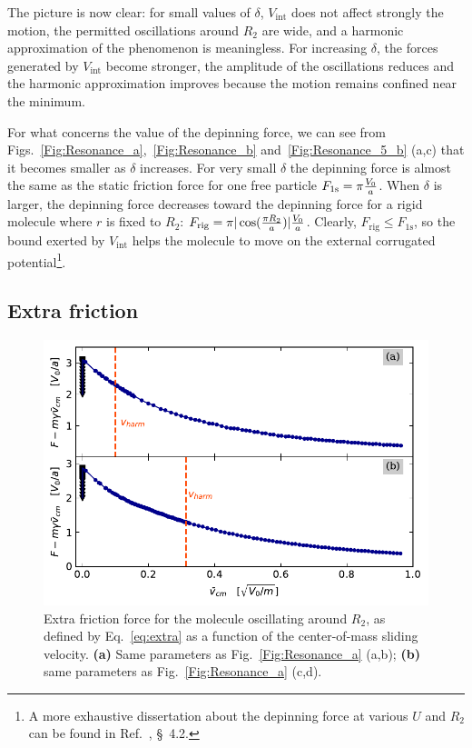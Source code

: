  

The picture is now clear: for small values of $\delta$, $V_\text{int}$ does not affect strongly the motion, the permitted oscillations around $R_2$ are wide, and a harmonic approximation of the phenomenon is meaningless. For increasing $\delta$, the forces generated by $V_\text{int}$ become stronger, the amplitude of the oscillations reduces and the harmonic approximation improves because the motion remains confined near the minimum.

For what concerns the value of the depinning force, we can see from Figs.~\ref{Fig:Resonance_a},~\ref{Fig:Resonance_b} and~\ref{Fig:Resonance_5_b}  (a,c) that it becomes smaller as $\delta$ increases. For very small $\delta$ the depinning force is almost the same as the static friction force for one free particle $F_\text{1s} = \pi \frac{V_0}{a}$. When $\delta$ is larger, the depinning force decreases toward the depinning force for a rigid molecule where $r$ is fixed to $R_2$: $F_\text{rig} = \pi |\cos(\frac{\pi R_2}{a})| \frac{V_0}{a}$. Clearly, $F_\text{rig} \leq F_\text{1s}$, so the bound exerted by $V_\text{int}$ helps the molecule to move on the external corrugated potential\footnote{A more exhaustive dissertation about the depinning force at various $U$ and $R_2$ can be found in Ref.~\cite{Cavallini}, \S~4.2.}.


\FloatBarrier
\subsection{Extra friction}

\begin{figure}
\begin{center}
    \centering
    \includegraphics[width=1\linewidth]{Images/Attrito_2_a.pdf}
    \caption{Extra friction force for the molecule oscillating around $R_2$, as defined by Eq.~\eqref{eq:extra} as a function of the center-of-mass sliding velocity. \textbf{(a)} Same parameters as Fig.~\ref{Fig:Resonance_a} (a,b); \textbf{(b)} same parameters as Fig.~\ref{Fig:Resonance_a} (c,d).}
    \label{Fig:Attrito_a}
\end{center}
\end{figure}

